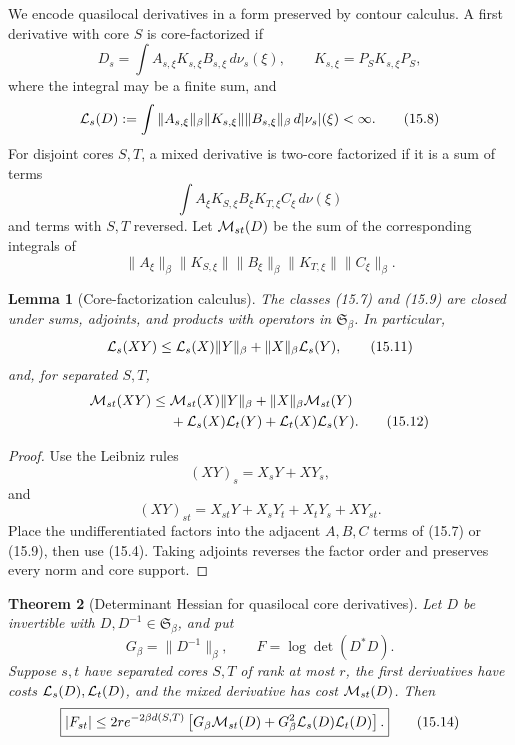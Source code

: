 \documentclass[11pt]{article}
\newtheorem{theorem}{Theorem}[section]
\newtheorem{lemma}[theorem]{Lemma}
\theoremstyle{remark}
\begin{document}
We encode quasilocal derivatives in a form preserved by contour
calculus.  A first derivative with core \(S\) is core-factorized if
\[
 D_s=\int A_{s,\xi}K_{s,\xi}B_{s,\xi}\,d\nu_s(\xi),
 \qquad
 K_{s,\xi}=P_SK_{s,\xi}P_S,                                 \tag{15.7}
\]
where the integral may be a finite sum, and
\[
 {\cal L}_s(D)
 :=
 \int
 \|A_{s,\xi}\|_\beta\|K_{s,\xi}\|
 \|B_{s,\xi}\|_\beta\,d|\nu_s|(\xi)<\infty.                 \tag{15.8}
\]
For disjoint cores \(S,T\), a mixed derivative is two-core
factorized if it is a sum of terms
\[
 \int A_\xi K_{S,\xi}B_\xi K_{T,\xi}C_\xi\,d\nu(\xi)         \tag{15.9}
\]
and terms with \(S,T\) reversed.  Let
\({\cal M}_{st}(D)\) be the sum of the corresponding integrals of
\[
 \|A_\xi\|_\beta\|K_{S,\xi}\|\|B_\xi\|_\beta
 \|K_{T,\xi}\|\|C_\xi\|_\beta.                              \tag{15.10}
\]

\begin{lemma}[Core-factorization calculus]
\label{lem:v15v15-calculus}
The classes (15.7) and (15.9) are closed under sums, adjoints, and
products with operators in \(\mathfrak S_\beta\).  In particular,
\[
 {\cal L}_s(XY)
 \le {\cal L}_s(X)\|Y\|_\beta+
      \|X\|_\beta{\cal L}_s(Y),                              \tag{15.11}
\]
and, for separated \(S,T\),
\[
\begin{aligned}
 {\cal M}_{st}(XY)
 \le{}&{\cal M}_{st}(X)\|Y\|_\beta+
       \|X\|_\beta{\cal M}_{st}(Y)\\
 &+{\cal L}_s(X){\cal L}_t(Y)
  +{\cal L}_t(X){\cal L}_s(Y).                              \tag{15.12}
\end{aligned}
\]
\end{lemma}

\begin{proof}
Use the Leibniz rules
\[
 (XY)_s=X_sY+XY_s,
\]
and
\[
 (XY)_{st}=X_{st}Y+X_sY_t+X_tY_s+XY_{st}.
\]
Place the undifferentiated factors into the adjacent \(A,B,C\)
terms of (15.7) or (15.9), then use (15.4).  Taking adjoints reverses
the factor order and preserves every norm and core support.
\end{proof}

\begin{theorem}[Determinant Hessian for quasilocal core derivatives]
\label{thm:v15v15-determinant}
Let \(D\) be invertible with \(D,D^{-1}\in\mathfrak S_\beta\), and
put
\[
 G_\beta=\|D^{-1}\|_\beta,\qquad
 F=\log\det(D^*D).                                          \tag{15.13}
\]
Suppose \(s,t\) have separated cores \(S,T\) of rank at most \(r\),
the first derivatives have costs
\({\cal L}_s(D),{\cal L}_t(D)\), and the mixed derivative has cost
\({\cal M}_{st}(D)\).  Then
\[
 \boxed{
 |F_{st}|
 \le
 2r e^{-2\beta d(S,T)}
 \left[
 G_\beta{\cal M}_{st}(D)
 +G_\beta^2{\cal L}_s(D){\cal L}_t(D)
 \right].}                                                  \tag{15.14}
\]
\end{theorem}
\end{document}
